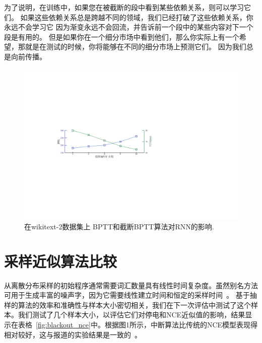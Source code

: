 为了说明，在训练中，如果您在被截断的段中看到某些依赖关系，则可以学习它们。 如果这些依赖关系总是跨越不同的领域，我们已经打破了这些依赖关系，你永远不会学习它 因为渐变永远不会回流，并告诉前一个段中的某些内容对下一个段是有用的。 但是如果你在一个细分市场中看到他们，那么你实际上有一个希望，那就是在测试的时候，你将能够在不同的细分市场上预测它们。 因为我们总是向前传播。
\begin{figure}[!h]
  \centering
  \includegraphics[width=0.9\columnwidth]{./figures/tbptt.pdf}
  \caption{在wikitext-2数据集上 BPTT和截断BPTT算法对RNN的影响.}\label{fig:tbptt}
\end{figure}
\section{采样近似算法比较}
从离散分布采样的初始程序通常需要词汇数量具有线性时间复杂度。虽然别名方法可用于生成丰富的噪声字，因为它需要线性建立时间和恒定的采样时间~。
基于抽样的算法的效率和准确性与样本大小密切相关，我们在下一次评估中测试了这个样本。我们测试了几个样本大小，以评估它们对停电和NCE近似值的影响，结果显示在表格~\ref{fig:blackout_nce}中。根据图1所示，中断算法比传统的NCE模型表现得相对较好，这与报道的实验结果是一致的~\cite{DBLP:journals/iclr/JiVSAD15}。


